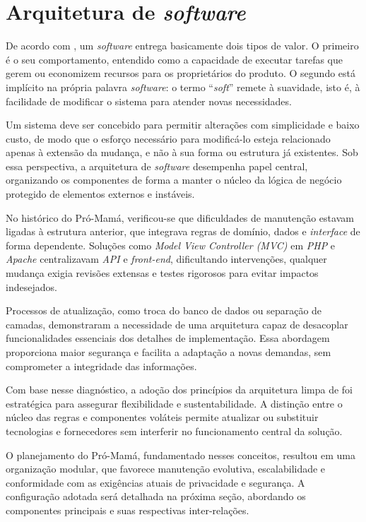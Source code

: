 \section{Arquitetura de \emph{software}}

De acordo com , um \emph{software} entrega basicamente dois tipos de valor. O primeiro é o seu comportamento, entendido como a capacidade de executar tarefas que gerem ou economizem recursos para os proprietários do produto. O segundo está implícito na própria palavra \emph{software}: o termo “\emph{soft}” remete à suavidade, isto é, à facilidade de modificar o sistema para atender novas necessidades.

Um sistema deve ser concebido para permitir alterações com simplicidade e baixo custo, de modo que o esforço necessário para modificá-lo esteja relacionado apenas à extensão da mudança, e não à sua forma ou estrutura já existentes. Sob essa perspectiva, a arquitetura de \emph{software} desempenha papel central, organizando os componentes de forma a manter o núcleo da lógica de negócio protegido de elementos externos e instáveis.

No histórico do Pró-Mamá, verificou-se que dificuldades de manutenção estavam ligadas à estrutura anterior, que integrava regras de domínio, dados e \emph{interface} de forma dependente. Soluções como \emph{Model View Controller (MVC)} em \emph{PHP} e \emph{Apache} centralizavam \emph{API} e \emph{front-end}, dificultando intervenções, qualquer mudança exigia revisões extensas e testes rigorosos para evitar impactos indesejados.

Processos de atualização, como troca do banco de dados ou separação de camadas, demonstraram a necessidade de uma arquitetura capaz de desacoplar funcionalidades essenciais dos detalhes de implementação. Essa abordagem proporciona maior segurança e facilita a adaptação a novas demandas, sem comprometer a integridade das informações.

Com base nesse diagnóstico, a adoção dos princípios da arquitetura limpa de  foi estratégica para assegurar flexibilidade e sustentabilidade. A distinção entre o núcleo das regras e componentes voláteis permite atualizar ou substituir tecnologias e fornecedores sem interferir no funcionamento central da solução.

O planejamento do Pró-Mamá, fundamentado nesses conceitos, resultou em uma organização modular, que favorece manutenção evolutiva, escalabilidade e conformidade com as exigências atuais de privacidade e segurança. A configuração adotada será detalhada na próxima seção, abordando os componentes principais e suas respectivas inter-relações.

